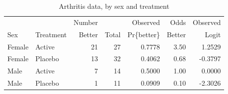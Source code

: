 \begin{table}[htb]
 \caption{Arthritis data, by sex and treatment}\label{tab:arthlogit3}
 \begin{center}
 \begin{tabular}{|ll|rrrrr|}
 \hline
      &           & Number &       & Observed &   Odds & Observed \\
  Sex & Treatment & Better & Total & Pr\{better\} & Better & Logit \\ 
   \hline 
  Female & Active & 21 & 27 & 0.7778 & 3.50 & 1.2529 \\ 
  Female & Placebo & 13 & 32 & 0.4062 & 0.68 & -0.3797 \\ 
  Male & Active & 7 & 14 & 0.5000 & 1.00 & 0.0000 \\ 
  Male & Placebo & 1 & 11 & 0.0909 & 0.10 & -2.3026 \\ 
 \hline
 \end{tabular}
 \end{center}
\end{table}

